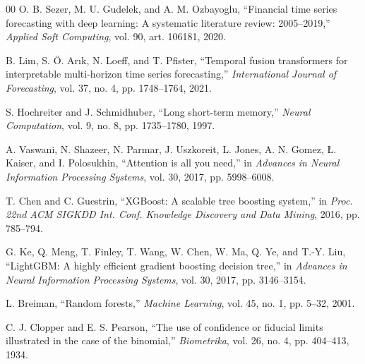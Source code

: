 \documentclass[conference]{IEEEtran}
\begin{document}
\begin{thebibliography}{00}
 O. B. Sezer, M. U. Gudelek, and A. M. Ozbayoglu,
``Financial time series forecasting with deep learning: A systematic literature
review: 2005--2019,'' \emph{Applied Soft Computing}, vol. 90, art. 106181, 2020.

 B. Lim, S. \"O. Ar{\i}k, N. Loeff, and T. Pfister, ``Temporal
fusion transformers for interpretable multi-horizon time series forecasting,''
\emph{International Journal of Forecasting}, vol. 37, no. 4, pp. 1748--1764,
2021.

 S. Hochreiter and J. Schmidhuber, ``Long short-term
memory,'' \emph{Neural Computation}, vol. 9, no. 8, pp. 1735--1780, 1997.

 A. Vaswani, N. Shazeer, N. Parmar, J. Uszkoreit, L. Jones,
A. N. Gomez, {\L}. Kaiser, and I. Polosukhin, ``Attention is all you need,'' in
\emph{Advances in Neural Information Processing Systems}, vol. 30, 2017,
pp. 5998--6008.

 T. Chen and C. Guestrin, ``XGBoost: A scalable tree boosting
system,'' in \emph{Proc. 22nd ACM SIGKDD Int. Conf. Knowledge Discovery and
Data Mining}, 2016, pp. 785--794.

 G. Ke, Q. Meng, T. Finley, T. Wang, W. Chen, W. Ma, Q. Ye, and
T.-Y. Liu, ``LightGBM: A highly efficient gradient boosting decision tree,'' in
\emph{Advances in Neural Information Processing Systems}, vol. 30, 2017,
pp. 3146--3154.

 L. Breiman, ``Random forests,'' \emph{Machine Learning},
vol. 45, no. 1, pp. 5--32, 2001.

 C. J. Clopper and E. S. Pearson, ``The use of confidence
or fiducial limits illustrated in the case of the binomial,''
\emph{Biometrika}, vol. 26, no. 4, pp. 404--413, 1934.

\end{thebibliography}
\end{document}

